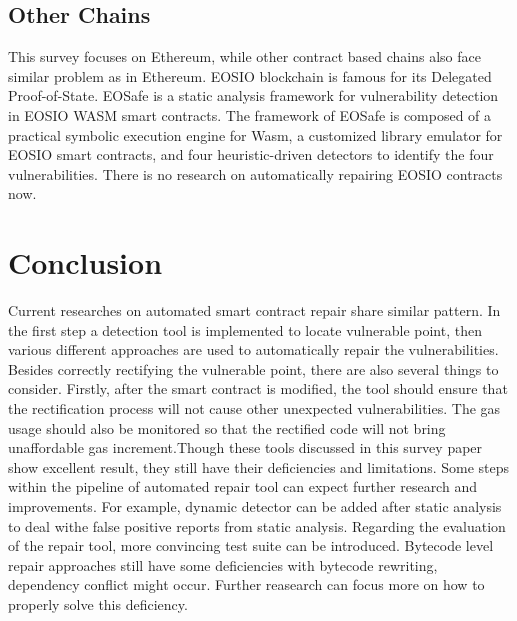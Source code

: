 \documentclass[sigplan,screen]{acmart}
\begin{document}
\subsection{Other Chains}

This survey focuses on Ethereum, while other contract based chains also face similar problem as in Ethereum. EOSIO blockchain \cite{huang2020characterizing} is famous for its Delegated Proof-of-State. EOSafe \cite{he2021eosafe} is a static analysis framework for vulnerability detection in EOSIO WASM smart contracts. The framework of EOSafe is composed of a practical symbolic execution engine for Wasm, a customized library emulator for EOSIO smart contracts, and four heuristic-driven detectors to identify the four vulnerabilities. There is no research on automatically repairing EOSIO contracts now.

\section{Conclusion}

Current researches on automated smart contract repair share similar pattern. In the first step a detection tool is implemented to locate vulnerable point, then various different approaches are used to automatically repair the vulnerabilities. Besides correctly rectifying the vulnerable point, there are also several things to consider. Firstly, after the smart contract is modified, the tool should ensure that the rectification process will not cause other unexpected vulnerabilities. The gas usage should also be monitored so that the rectified code will not bring unaffordable gas increment.Though these tools discussed in this survey paper show excellent result, they still have their deficiencies and limitations. Some steps within the pipeline of automated repair tool can expect further research and improvements. For example, dynamic detector can be added after static analysis to deal withe false positive reports from static analysis. Regarding the evaluation of the repair tool, more convincing test suite can be introduced. Bytecode level repair approaches still have some deficiencies with bytecode rewriting, dependency conflict might occur. Further reasearch can focus more on how to properly solve this deficiency.


\end{document}
